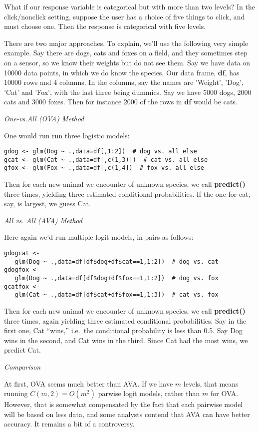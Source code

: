 What if our response variable is categorical but with more than two
levels?  In the click/nonclick setting, suppose the user has a choice of
five things to click, and must choose one.  Then the response is
categorical with five levels.  

There are two major approaches.  To explain, we'll use the following
very simple example. Say there are dogs, cats and foxes on a field, and
they sometimes step on a sensor, so we know their weights but do not see
them.  Say we have data on 10000 data points, in which we do know the
species.  Our data frame, \textbf{df}, has 10000 rows and 4 columns.  In
the columns, say the names are 'Weight', 'Dog', 'Cat' and 'Fox', with
the last three being dummies.  Say we have 5000 dogs, 2000 cats and 3000
foxes.  Then for instance 2000 of the rows in \textbf{df} would be cats.

\textit{One-vs.All (OVA) Method}

One would run run three logistic models:

\begin{lstlisting}
gdog <- glm(Dog ~ .,data=df[,1:2])  # dog vs. all else
gcat <- glm(Cat ~ .,data=df[,c(1,3)])  # cat vs. all else
gfox <- glm(Fox ~ .,data=df[,c(1,4])  # fox vs. all else
\end{lstlisting}

Then for each new animal we encounter of unknown species, we call
\textbf{predict()} three times, yielding three estimated conditional
probabilities.  If the one for cat, say, is largest, we guess Cat.

\textit{All vs. All (AVA) Method}

Here again we'd run multiple logit models, in pairs as follows:

\begin{lstlisting}
gdogcat <- 
   glm(Dog ~ .,data=df[df$dog+df$cat==1,1:2])  # dog vs. cat
gdogfox <- 
   glm(Dog ~ .,data=df[df$dog+df$fox==1,1:2])  # dog vs. fox
gcatfox <- 
   glm(Cat ~ .,data=df[df$cat+df$fox==1,1:3])  # cat vs. fox
\end{lstlisting}

Then for each new animal we encounter of unknown species, we call
\textbf{predict()} three times, again yielding three estimated
conditional probabilities.  Say in the first one, Cat ``wins,'' i.e.\
the conditional probability is less than 0.5.  Say Dog wins in the
second, and Cat wins in the third.  Since Cat had the most wins, we
predict Cat.

\textit{Comparison}

At first, OVA seems much better than AVA.  If we have $m$ levels, that
means running $C(m,2) = O(m^2)$ parwise logit models, rather than $m$
for OVA.  However, that is somewhat compensated by the fact that each
pairwise model will be based on less data, and some analysts contend
that AVA can have better accuracy.  It remains a bit of a controversy.

